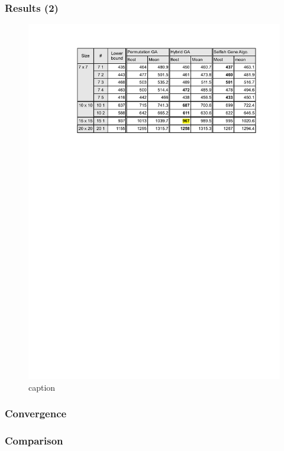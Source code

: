 \begin{frame}
  \frametitle{Results (2)}
\begin{figure}[htbp]
	\centering
		\includegraphics[scale=.5]{images/results2.pdf}
	\caption{caption}
	\label{fig:label}
\end{figure}
\end{frame}


\begin{frame}
  \frametitle{Convergence}
\end{frame}

\begin{frame}
  \frametitle{Comparison}
\end{frame}